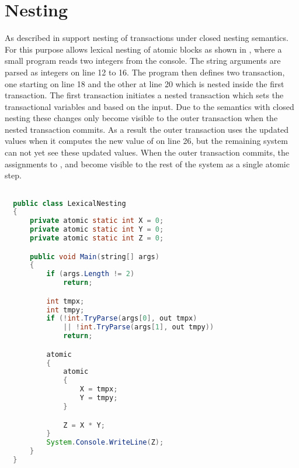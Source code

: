 \section{Nesting}\label{sec:nesting_design}
As described in  \stmnamesp support nesting of transactions under closed nesting semantics. For this purpose \stmnamesp allows lexical nesting of atomic blocks as shown in , where a small program reads two integers from the console. The string arguments are parsed as integers on line 12 to 16. The program then defines two transaction, one starting on line 18 and the other at line 20 which is nested inside the first transaction. The first transaction initiates a nested transaction which sets the transactional variables  and  based on the input. Due to the semantics with closed nesting these changes only become visible to the outer transaction when the nested transaction commits. As a result the outer transaction uses the updated values when it computes the new value of  on line 26, but the remaining system can not yet see these updated values. When the outer transaction commits, the assignments to ,  and  become visible to the rest of the system as a single atomic step.

\begin{lstlisting}[label=lst:stm_syntax_lexical_nesting,
  caption={Lexical Nesting},
  language=Java,  
  showspaces=false,
  showtabs=false,
  breaklines=true,
  showstringspaces=false,
  breakatwhitespace=true,
  commentstyle=\color{greencomments},
  keywordstyle=\color{bluekeywords},
  stringstyle=\color{redstrings},
  morekeywords={atomic, retry, orelse, var, get, set, using}]  % Start your code-block

  public class LexicalNesting
  {
      private atomic static int X = 0;
      private atomic static int Y = 0;
      private atomic static int Z = 0;

      public void Main(string[] args)
      {
          if (args.Length != 2)
              return;

          int tmpx;
          int tmpy;
          if (!int.TryParse(args[0], out tmpx) 
              || !int.TryParse(args[1], out tmpy))
              return;

          atomic
          {
              atomic
              {
                  X = tmpx;
                  Y = tmpy;
              }

              Z = X * Y;
          }
          System.Console.WriteLine(Z);
      }
  }
\end{lstlisting}


